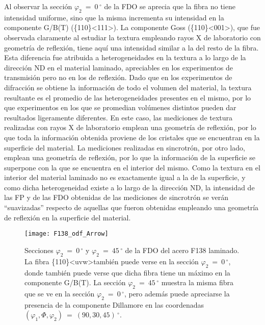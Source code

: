 Al observar la sección $\varphi_2 \ = \ 0$\,$^{\circ}$ de la FDO se aprecia que la fibra no tiene intensidad uniforme, sino que la misma incrementa su intensidad en la componente  G/B(T) (\{110\}\textless 111\textgreater). 
La componente Goss (\{110\}\textless 001\textgreater), que fue observada claramente al estudiar la textura empleando rayos X de laboratorio con geometría de reflexión, tiene aquí una intensidad similar a la del resto de la fibra.
Esta diferencia fue atribuida a heterogeneidades en la textura a lo largo de la dirección ND en el material laminado, apreciables en los experimentos de transmisión pero no en los de reflexión. 
Dado que en los experimentos de difracción se obtiene la información de todo el volumen del material, la textura resultante es el promedio de las heterogeneidades presentes en el mismo, por lo que experimentos en los que se promedian volúmenes distintos pueden dar resultados ligeramente diferentes.
En este caso, las mediciones de textura realizadas con rayos X de laboratorio emplean una geometría de reflexión, por lo que toda la información obtenida proviene de los cristales que se encuentran en la superficie del material.
La mediciones realizadas en sincrotrón, por otro lado, emplean una geometría de reflexión, por lo que la información de la superficie se superpone con la que se encuentra en el interior del mismo.
Como la textura en el interior del material laminado no es exactamente igual a la de la superficie, y como dicha heterogeneidad existe a lo largo de la dirección ND, la intensidad de las FP y de las FDO obtenidas de las mediciones de sincrotrón se verán ``suavizadas'' respecto de aquellas que fueron obtenidas empleando una geometría de reflexión en la superficie del material.

\begin{figure}[!htb]
  \centering
  \texttt{[image: F138\_odf\_Arrow]}
  \caption{Secciones $\varphi_2 \ = \ 0$\,$^{\circ}$ y $\varphi_2 \ = \ 45$\,$^{\circ}$ de la FDO del acero F138 laminado. La fibra \{110\}\textless uvw\textgreater también puede verse en la sección $\varphi_2 \ = \ 0$\,$^{\circ}$, donde también puede verse que dicha fibra tiene un máximo en la componente G/B(T). La sección $\varphi_2 \ = \ 45$\,$^{\circ}$ muestra la misma fibra que se ve en la sección $\varphi_2 \ = \ 0$\,$^{\circ}$, pero además puede apreciarse la presencia de la componente Dillamore en las coordenadas $(\varphi_1, \Phi, \varphi_2) \ = \ (90, 30, 45)$\,$^{\circ}$.}
  \label{fig:F138ODF}
\end{figure}


